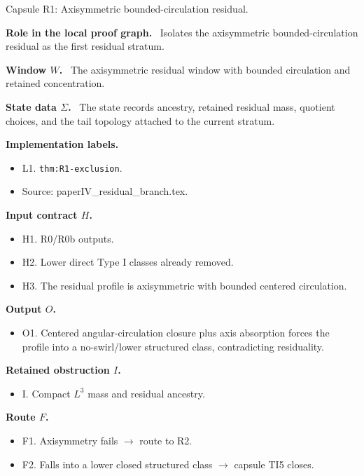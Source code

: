 \documentclass[11pt]{amsart}
\newcommand{\capsulefield}[1]{\par\smallskip\noindent\textbf{#1.}\ }
\begin{document}
\begin{proofcapsule}{Capsule R1: Axisymmetric bounded-circulation residual.}
  \capsulefield{Role in the local proof graph}
  Isolates the axisymmetric bounded-circulation residual as the first residual stratum.

  \capsulefield{Window \(W\)}
The axisymmetric residual window with bounded circulation and retained concentration.

  \capsulefield{State data \(\Sigma\)}
The state records ancestry, retained residual mass, quotient choices, and the tail topology attached to the current stratum.

  \capsulefield{Implementation labels}
  \begin{itemize}[leftmargin=1.8em]
  \item L1. \texttt{thm:R1-exclusion}.
  \item Source: paperIV\_residual\_branch.tex.
  \end{itemize}

  \capsulefield{Input contract \(H\)}
  \begin{itemize}[leftmargin=1.8em]
  \item H1. R0/R0b outputs.
  \item H2. Lower direct Type I classes already removed.
  \item H3. The residual profile is axisymmetric with bounded centered circulation.
  \end{itemize}

  \capsulefield{Output \(O\)}
  \begin{itemize}[leftmargin=1.8em]
  \item O1. Centered angular-circulation closure plus axis absorption forces the profile into a no-swirl/lower structured class, contradicting residuality.
  \end{itemize}

  \capsulefield{Retained obstruction \(I\)}
  \begin{itemize}[leftmargin=1.8em]
  \item I. Compact $L^3$ mass and residual ancestry.
  \end{itemize}

  \capsulefield{Route \(F\)}
  \begin{itemize}[leftmargin=1.8em]
  \item F1. Axisymmetry fails $\to$ route to R2.
  \item F2. Falls into a lower closed structured class $\to$ capsule TI5 closes.
  \end{itemize}


\end{proofcapsule}
\end{document}
